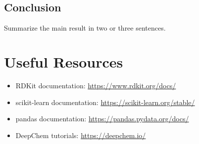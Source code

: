 \documentclass[11pt]{report}
\newenvironment{Important note}{\begin{quote}\color{red}\textbf{Important note:} }{\end{quote}}
\begin{document}
\section*{Conclusion}

Summarize the main result in two or three sentences.

\chapter{Useful Resources}

\begin{itemize}[leftmargin=*]
    \item RDKit documentation: \url{https://www.rdkit.org/docs/}
    \item scikit-learn documentation: \url{https://scikit-learn.org/stable/}
    \item pandas documentation: \url{https://pandas.pydata.org/docs/}
    \item DeepChem tutorials: \url{https://deepchem.io/}
\end{itemize}
\end{document}
